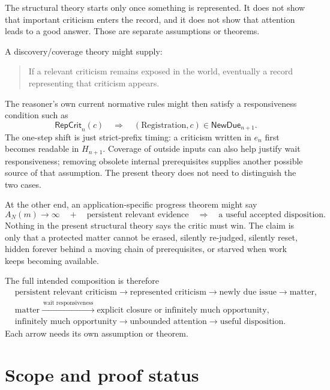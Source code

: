 \documentclass[11pt]{article}
\theoremstyle{definition}
\theoremstyle{remark}
\newcommand{\NewDue}{\mathsf{NewDue}}
\newcommand{\RepCrit}{\mathsf{RepCrit}}
\begin{document}
The structural theory starts only once something is represented. It does not
show that important criticism enters the record, and it does not show that
attention leads to a good answer. Those are separate assumptions or theorems.

A discovery/coverage theory might supply:
\begin{quote}
If a relevant criticism remains exposed in the world, eventually a record
representing that criticism appears.
\end{quote}
The reasoner's own current normative rules might then satisfy a responsiveness
condition such as
\[
 \RepCrit_n(c)
 \quad\Longrightarrow\quad
 (\mathrm{Registration},c)\in\NewDue_{n+1}.
\]
The one-step shift is just strict-prefix timing: a criticism written in $e_n$
first becomes readable in $H_{n+1}$. Coverage of outside inputs can also help
justify wait responsiveness; removing obsolete internal prerequisites supplies
another possible source of that assumption. The present theory does not need to
distinguish the two cases.

At the other end, an application-specific progress theorem might say
\[
 A_N(m)\to\infty
 \quad+\quad
 \text{persistent relevant evidence}
 \quad\Longrightarrow\quad
 \text{a useful accepted disposition}.
\]
Nothing in the present structural theory says the critic must win. The claim is
only that a protected matter cannot be erased, silently re-judged, silently
reset, hidden forever behind a moving chain of prerequisites, or starved when
work keeps becoming available.

The full intended composition is therefore
\[
\begin{aligned}
&\text{persistent relevant criticism}
  \longrightarrow \text{represented criticism}
  \longrightarrow \text{newly due issue}
  \longrightarrow \text{matter},\\[4pt]
&\text{matter}
  \xrightarrow{\ \text{wait responsiveness}\ } \text{explicit closure or infinitely much opportunity},\\[4pt]
&\text{infinitely much opportunity}
  \longrightarrow \text{unbounded attention}
  \longrightarrow \text{useful disposition}.
\end{aligned}
\]
Each arrow needs its own assumption or theorem.

\section{Scope and proof status}\label{sec:scope}
\end{document}
